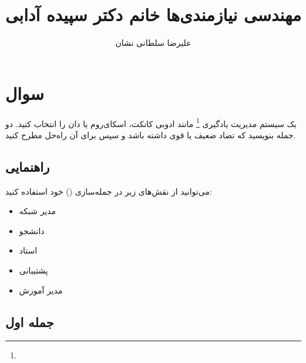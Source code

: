 \documentclass[a4paper]{article}
\title{مهندسی نیازمندی‌ها خانم دکتر سپیده آدابی}
\author{علیرضا سلطانی نشان}
\begin{document}
\maketitle

\section*{سوال}
یک سیستم مدیریت یادگیری \footnote{} مانند ادوبی
کانکت، اسکای‌روم یا دان را انتخاب کنید. دو جمله بنویسید که تضاد ضعیف یا قوی
داشته باشد و سپس برای آن راه‌حل مطرح کنید.

\subsection*{راهنمایی}

می‌توانید از نقش‌های زیر در جمله‌سازی () خود استفاده کنید:

\begin{itemize}
    \item مدیر شبکه
    \item دانشجو
    \item استاد
    \item پشتیبانی
    \item مدیر آموزش
\end{itemize}

\subsection*{جمله اول}
\end{document}
